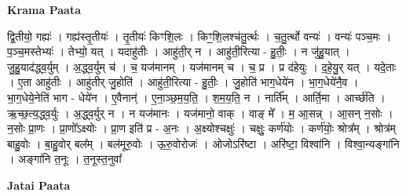 \documentclass[17pt]{extarticle}
\begin{document}
\textbf{Krama Paata} \newline

द्वि॒तीयो॒ गह्यः॑ । गह्य॑स्तृ॒तीयः॑ । तृ॒तीयः॑ किꣳशि॒लः । किꣳ॒॒शि॒लश्च॑तु॒र्त्थः । च॒तु॒र्त्थो वन्यः॑ । वन्यः॑ पञ्च॒मः । प॒ञ्च॒मस्तेभ्यः॑ । तेभ्यो॒ यत् । यदाहु॑तीः । आहु॑ती॒र् न । आहु॑ती॒रित्या - हु॒तीः॒ । न जु॑हु॒यात् । जु॒हु॒याद॑द्ध्व॒र्युम् । अ॒द्ध्व॒र्युम् च॑ । च॒ यज॑मानम् । यज॑मानम् च । च॒ प्र । प्र द॑हेयुः । द॒हे॒यु॒र् यत् । यदे॒ताः । ए॒ता आहु॑तीः । आहु॑तीर् जु॒होति॑ । आहु॑ती॒रित्या - हु॒तीः॒ । जु॒होति॑ भाग॒धेये॑न । भा॒ग॒धेये॑नै॒व । भा॒ग॒धेये॒नेति॑ भाग - धेये॑न । ए॒वैनान्॑ । ए॒ना॒ञ्छ॒म॒य॒ति॒ । श॒म॒य॒ति॒ न । नार्ति᳚म् । आर्ति॒मा । आर्च्छ॑ति । ऋ॒च्छ॒त्य॒द्ध्व॒र्युः । अ॒द्ध्व॒र्युर् न । न यज॑मानः । यज॑मानो॒ वाक् । वाङ् मे᳚ । म॒ आ॒सन्न् । आ॒सन् न॒सोः । न॒सोः प्रा॒णः । प्रा॒णो᳚ऽक्ष्योः । प्रा॒ण इति॑ प्र - अ॒नः । अ॒क्ष्योश्चक्षुः॑ । चक्षुः॒ कर्ण॑योः । कर्ण॑योः॒ श्रोत्र᳚म् । श्रोत्र॑म् बाहु॒वोः । बा॒हु॒वोर् बल᳚म् । बल॑मूरु॒वोः । ऊ॒रु॒वोरोजः॑ । ओजोऽरि॑ष्टा । अरि॑ष्टा॒ विश्वा॑नि । विश्वा॒न्यङ्गा॑नि । अङ्गा॑नि त॒नूः । त॒नूस्त॒नुवा᳚ \newline

\textbf{Jatai Paata} \newline
\end{document}
